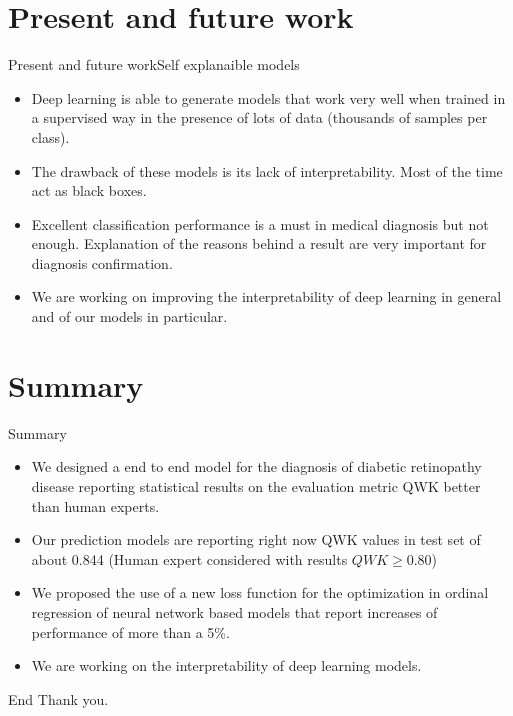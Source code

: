 \documentclass{beamer}
\begin{document}
\section{Present and future work}
\begin{frame}{Present and future work}{Self explanaible models}	
	\begin{itemize}
		\item  Deep learning is able to generate models that work very well when trained in a supervised way in the presence of lots of data (thousands of samples per class).
		\item The drawback of these models is its lack of interpretability. Most of the time act as black boxes.
		\item Excellent classification performance is a must in medical diagnosis but not enough. Explanation of the reasons behind a result are very important for diagnosis confirmation.
		\item We are working on improving the interpretability of deep learning in general and of our models in particular.
	\end{itemize}	
\end{frame}



\section*{Summary}

\begin{frame}{Summary}
  \begin{itemize}
  \item
    We designed a end to end model for the diagnosis of diabetic retinopathy disease reporting statistical results on the evaluation metric QWK better than human experts.
  \item Our prediction models are reporting right now QWK values in test set of about 0.844 (Human expert considered with results $QWK\ge0.80$)    
  \item
    We proposed the use of a new loss function for the optimization in ordinal regression of neural network based models that report increases of performance of more than a 5\%.
  \item
    We are working on the interpretability of deep learning models.
  \end{itemize}
\end{frame}

\begin{frame}{End}
\centering
\huge Thank you.
\end{frame}
\end{document}
